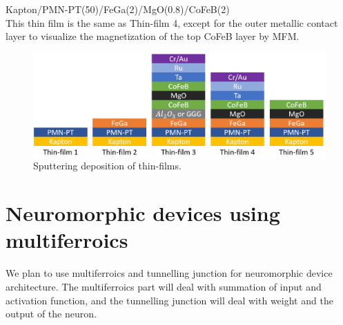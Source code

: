 \documentclass[12pt,a4paper,bold]{thesis}
\theoremstyle{thm}
\theoremstyle{definition}
\begin{document}
Kapton/PMN-PT(50)/FeGa(2)/MgO(0.8)/CoFeB(2)\\
This thin film is the same as Thin-film 4, except for the outer metallic contact layer to visualize the magnetization of the top CoFeB layer by MFM.
\begin{figure}[H]
	\centering
   \includegraphics[width=13cm]{Images/52.png} 
   \caption{Sputtering deposition of thin-films.}
\end{figure}

\pagebreak
\section{Neuromorphic devices using multiferroics}
\indent \indent\indent We plan to use multiferroics and tunnelling junction for neuromorphic device architecture. The multiferroics part will deal with summation of input and activation function, and the tunnelling junction will deal with weight and the output of the neuron.
\end{document}

